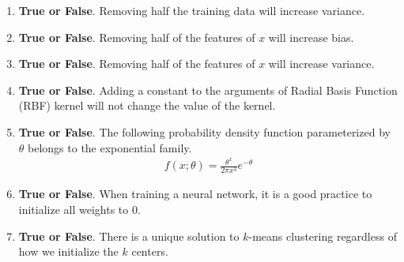 \documentclass{article}
\newif\ifsolutions
\newenvironment{labelledanswer}{{\bf Answer:} \sf }{}%
\newcommand{\answer}[2]
{{
\ifsolutions
\begin{labelledanswer}
\color{red} 
#2
\end{labelledanswer}
\else
#1
\fi
}}
\begin{document}
\begin{enumerate}

\item \textbf{True or False}. Removing half the training data will increase variance.

\answer{}{True, this should mean that the model will have less to work with for prediction. The test prediction will likely be larger than before, indicating incrase variance.}

\item \textbf{True or False}. Removing half of the features of $x$ will increase bias.

\answer{}{True, this would increase bias since it forces the model to assume more with less information available.}

\item \textbf{True or False}. Removing half of the features of $x$ will increase variance.

\answer{}{False, removing features leads to increase in bias, which could lead to decrease in variance. }

\item \textbf{True or False}. Adding a constant to the arguments of Radial Basis Function (RBF) kernel will not change the value of the kernel.

\answer{}{True, since RBF kernels rely on calculating squared distance. This squared distance would be unchanged as $((x+c) - (x'+c))^2 = ((x - x')^2 $.}

\item \textbf{True or False}. The following probability density function parameterized by $\theta$ belongs to the exponential family.
\begin{align}
f(x;\theta) = \frac{\theta^x}{2\pi x^3}e^{-\theta}
\end{align}

\answer{}{False, $\theta^x$ is problematic here.}

\item \textbf{True or False}. When training a neural network, it is a good practice to initialize all weights to $0$.

\answer{}{False, we need random initialization. The reason is discussed in "Parameters Initialization" in Deep Learning Notes, but essentially to avoid the same output for first layer.}

\item \textbf{True or False}. There is a unique solution to $k$-means clustering regardless of how we initialize the $k$ centers. 

\answer{}{False, depending on how we initialize the $k$ centers, it'll impact the distance calculation to determine which group an examples belong to. This can in turn result in a different $k$-means solution as we run the algorithm each time through the same dataset.}

\end{enumerate}
\end{document}
